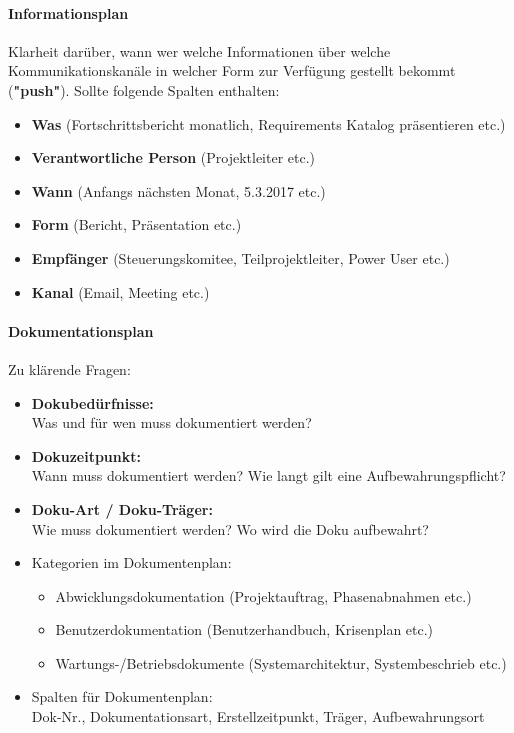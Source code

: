 \documentclass[a4paper]{article}
\begin{document}
		\paragraph{Informationsplan}
		
		Klarheit darüber, wann wer welche Informationen über welche Kommunikationskanäle in welcher Form zur Verfügung gestellt bekommt (\textbf{"push"}). Sollte folgende Spalten enthalten:
		
		\begin{itemize}
			\item \textbf{Was} (Fortschrittsbericht monatlich, Requirements Katalog präsentieren etc.)
			\item \textbf{Verantwortliche Person} (Projektleiter etc.)
			\item \textbf{Wann} (Anfangs nächsten Monat, 5.3.2017 etc.)
			\item \textbf{Form} (Bericht, Präsentation etc.)
			\item \textbf{Empfänger} (Steuerungskomitee, Teilprojektleiter, Power User etc.)
			\item \textbf{Kanal} (Email, Meeting etc.)
		\end{itemize}
		
		\paragraph{Dokumentationsplan}
		
		Zu klärende Fragen:
		
		\begin{itemize}
			\item \textbf{Dokubedürfnisse:}\\
			Was und für wen muss dokumentiert werden?
			\item \textbf{Dokuzeitpunkt:}\\
			Wann muss dokumentiert werden? Wie langt gilt eine Aufbewahrungspflicht?
			\item \textbf{Doku-Art / Doku-Träger:}\\
			Wie muss dokumentiert werden? Wo wird die Doku aufbewahrt?\\
			
			\item Kategorien im Dokumentenplan:
				\begin{itemize}
					\item Abwicklungsdokumentation (Projektauftrag, Phasenabnahmen etc.)
					\item Benutzerdokumentation (Benutzerhandbuch, Krisenplan etc.)
					\item Wartungs-/Betriebsdokumente (Systemarchitektur, Systembeschrieb etc.)
				\end{itemize}
			\item Spalten für Dokumentenplan:\\
			Dok-Nr., Dokumentationsart, Erstellzeitpunkt, Träger, Aufbewahrungsort
		\end{itemize}
		
\end{document}
